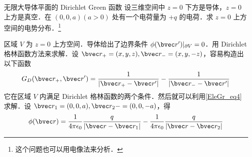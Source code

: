 \begin{example}{无限大导体平面的 Dirichlet Green 函数}
设三维空间中 $z=0$ 下方是导体，$z=0$ 上方是真空．在 $(0,0,a)(a>0)$ 处有一个电荷量为 $+q$ 的电荷．求 $z=0$ 上方空间的电势分布．\footnote{这个问题也可以用电像法来分析．}

区域 $V$ 为 $z=0$ 上方空间．导体给出了边界条件 $\phi(\bvec r')|_{\partial V}=0$．用 Dirichlet 格林函数方法来求解．设 $\bvec r_+=(x,y,z),\bvec r_-=(x,y,-z)$，容易构造出以下函数
\begin{equation}
G_D(\bvec r_+,\bvec r')=\frac{1}{|\bvec r_+-\bvec r'|}-\frac{1}{|\bvec r_--\bvec r'|}
\end{equation}
它在区域 $V$ 内满足 Dirichlet 格林函数的两个条件．然后就可以利用\autoref{EleGr_eq4} 求解．设 $\bvec r_1=(0,0,a),\bvec r_2-=(0,0,-a)$，得
\begin{equation}
\phi(\bvec r)=\frac{1}{4\pi \epsilon_0}\frac{q}{|\bvec r-\bvec r_1|}-\frac{1}{4\pi \epsilon_0}\frac{q}{|\bvec r-\bvec r_2|}
\end{equation}

\end{example}
